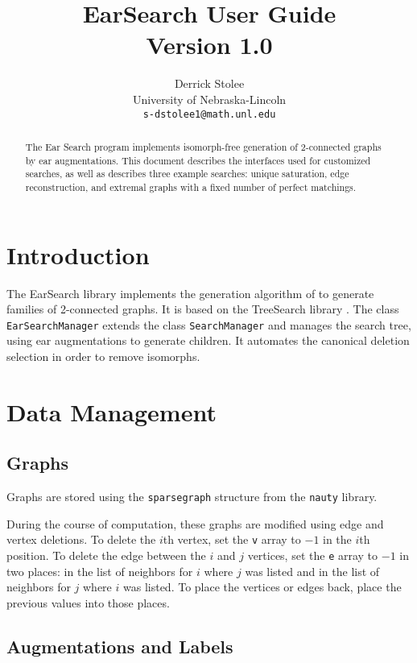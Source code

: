 \documentclass[11pt]{article}
\title{EarSearch User Guide\\ {\large Version 1.0}}
\author{Derrick Stolee \\ 
	University of Nebraska-Lincoln\\ 
	\texttt{s-dstolee1@math.unl.edu}
       }
\begin{document}
\maketitle
\vspace{-.3in}
\begin{abstract}
	The Ear Search program implements isomorph-free generation
		of 2-connected graphs by ear augmentations.
	This document describes the interfaces used for customized
		searches, as well as describes three example searches:
		unique saturation, edge reconstruction, and 
		extremal graphs with a fixed number of perfect matchings.
\end{abstract}

\section{Introduction}
\label{sec:Introduction}

The EarSearch library implements the generation algorithm of
	\cite{IsomorphFreeGen} to generate families of 2-connected graphs.
It is based on the TreeSearch library \cite{TreeSearch}.
The class \texttt{EarSearchManager} extends the class \texttt{SearchManager}
	and manages the search tree,
	using ear augmentations to generate children.
It automates the canonical deletion selection in order
	to remove isomorphs.
	

\section{Data Management}


\subsection{Graphs}

Graphs are stored 
	using the \texttt{sparsegraph} structure 
	from the \texttt{nauty} library.

During the course of computation, these graphs are modified using edge and vertex deletions.
To delete the $i$th vertex, set the \texttt{v} array to $-1$ in the $i$th position.
To delete the edge between the $i$ and $j$ vertices,
	set the \texttt{e} array to $-1$ in two places:
	in the list of neighbors for $i$ where $j$ was listed
	and in the list of neighbors for $j$ where $i$ was listed.
To place the vertices or edges back, place the previous values into those places.



\subsection{Augmentations and Labels}
\end{document}
